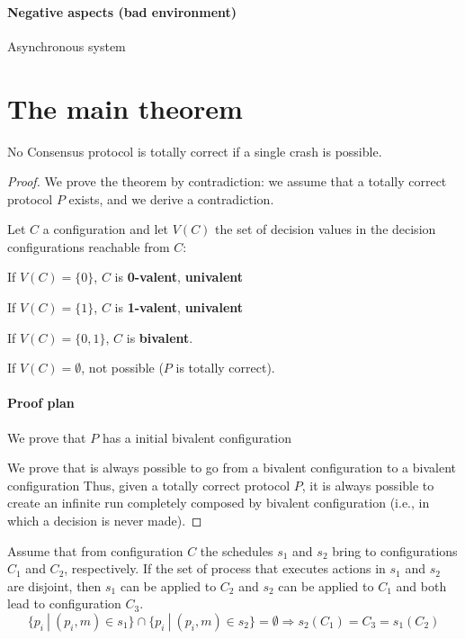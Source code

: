 \documentclass[12pt]{article}
\begin{document}
\paragraph*{Negative aspects (bad environment)}
\BI
\item Asynchronous system
\EI

\section*{The main theorem}

\begin{theorem}
No Consensus protocol is totally correct if a single crash is possible.
\end{theorem}

\begin{proof}
We prove the theorem by contradiction: we assume that a totally correct 
protocol $P$ exists, and we derive a contradiction.

Let $C$ a configuration and let $V(C)$ the set of decision values in
the decision configurations reachable from $C$:
\BI
\item If $V(C) = \{ 0 \}$, $C$ is {\bf 0-valent}, {\bf univalent}
\item If $V(C) = \{ 1 \}$, $C$ is {\bf 1-valent}, {\bf univalent}
\item If $V(C) = \{ 0,1 \}$, $C$ is {\bf bivalent}.
\item If $V(C) = \emptyset$, not possible ($P$ is totally correct).
\EI

\paragraph{Proof plan}

\BE
\item We prove that $P$ has a initial bivalent configuration
\item We prove that is always possible to go from a bivalent configuration to 
  a bivalent configuration
\EE
Thus, given a totally correct protocol $P$, it is always possible to 
create an infinite run completely composed by bivalent configuration
(i.e., in which a decision is never made).

\end{proof}


\begin{lemma}
Assume that from configuration $C$ the schedules
$s_1$ and $s_2$ bring to configurations $C_1$ and $C_2$,
respectively. If the set of process that executes actions in
$s_1$ and $s_2$ are disjoint, then $s_1$ can be applied to $C_2$
and $s_2$ can be applied to $C_1$ and both lead to configuration
$C_3$.
\[
  \{ p_i ~|~ (p_i, m) \in s_1 \} \cap \{ p_i ~|~ (p_i, m) \in s_2 \} = \emptyset \Rightarrow s_2(C_1) = C_3 = s_1(C_2)
\]
\end{lemma}
\end{document}
